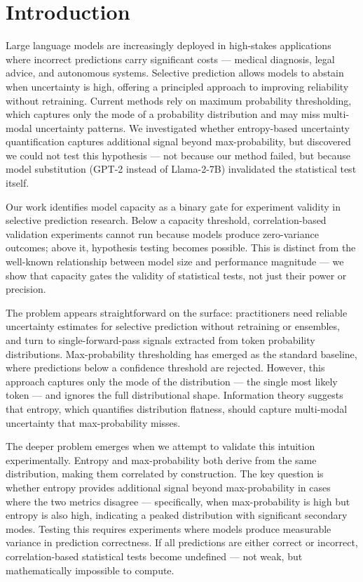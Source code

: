 \section{Introduction}

Large language models are increasingly deployed in high-stakes applications where incorrect predictions carry significant costs --- medical diagnosis, legal advice, and autonomous systems. Selective prediction allows models to abstain when uncertainty is high, offering a principled approach to improving reliability without retraining. Current methods rely on maximum probability thresholding, which captures only the mode of a probability distribution and may miss multi-modal uncertainty patterns. We investigated whether entropy-based uncertainty quantification captures additional signal beyond max-probability, but discovered we could not test this hypothesis --- not because our method failed, but because model substitution (GPT-2 instead of Llama-2-7B) invalidated the statistical test itself.

Our work identifies model capacity as a binary gate for experiment validity in selective prediction research. Below a capacity threshold, correlation-based validation experiments cannot run because models produce zero-variance outcomes; above it, hypothesis testing becomes possible. This is distinct from the well-known relationship between model size and performance magnitude --- we show that capacity gates the validity of statistical tests, not just their power or precision.

The problem appears straightforward on the surface: practitioners need reliable uncertainty estimates for selective prediction without retraining or ensembles, and turn to single-forward-pass signals extracted from token probability distributions. Max-probability thresholding has emerged as the standard baseline, where predictions below a confidence threshold are rejected. However, this approach captures only the mode of the distribution --- the single most likely token --- and ignores the full distributional shape. Information theory suggests that entropy, which quantifies distribution flatness, should capture multi-modal uncertainty that max-probability misses.

The deeper problem emerges when we attempt to validate this intuition experimentally. Entropy and max-probability both derive from the same distribution, making them correlated by construction. The key question is whether entropy provides additional signal beyond max-probability in cases where the two metrics disagree --- specifically, when max-probability is high but entropy is also high, indicating a peaked distribution with significant secondary modes. Testing this requires experiments where models produce measurable variance in prediction correctness. If all predictions are either correct or incorrect, correlation-based statistical tests become undefined --- not weak, but mathematically impossible to compute.

